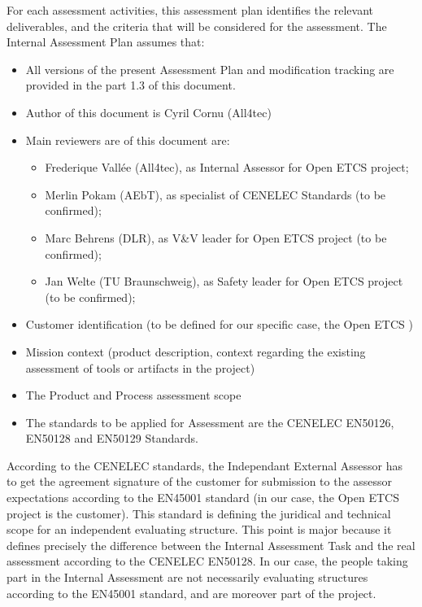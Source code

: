\documentclass{template/openetcs_article}
\begin{document}
For each assessment activities, this assessment plan identifies the relevant deliverables, and the criteria that will be considered for the assessment.
The Internal Assessment Plan assumes that: 
\begin{itemize}
\item All versions of the present Assessment Plan and modification tracking are provided in the part 1.3 of this document.
\item Author of this document is Cyril Cornu (All4tec)
\item Main reviewers are of this document are:
	\begin{itemize}
	\item Frederique Vall\'ee (All4tec), as Internal Assessor for Open ETCS project;
	\item Merlin Pokam (AEbT), as specialist of CENELEC Standards (to be confirmed);
	\item Marc Behrens (DLR), as V\&V leader for Open ETCS project (to be confirmed);
	\item Jan Welte (TU Braunschweig), as Safety leader for Open ETCS project (to be confirmed);
	\end{itemize}
\item Customer identification (to be defined for our specific case, the Open ETCS )
\item Mission context (product description, context regarding the existing assessment of tools or artifacts in the project)
\item The Product and Process assessment scope
\item The standards to be applied for Assessment are the CENELEC EN50126, EN50128 and EN50129 Standards.
\end{itemize}

According to the CENELEC standards, the Independant External Assessor has to get the agreement signature of the customer for submission to the assessor expectations according to the EN45001 standard  (in our case, the Open ETCS project is the customer). This standard is defining the juridical and technical scope for an independent evaluating structure.
This point is major because it defines precisely the difference between the Internal Assessment Task and the real assessment according to the CENELEC EN50128. In our case, the people taking part in the Internal Assessment are not necessarily evaluating structures according to the EN45001 standard, and are moreover part of the project.

\newpage
\end{document}
